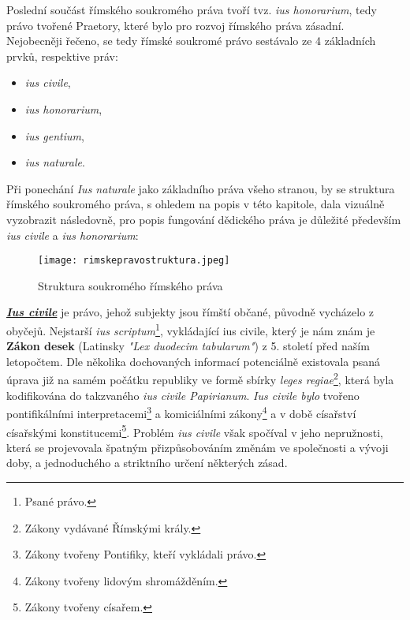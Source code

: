 \documentclass{article}
\begin{document}
Poslední součást římského soukromého práva tvoří tvz. \textit{ius honorarium}, tedy právo tvořené Praetory, které bylo pro rozvoj římského práva zásadní. \\


Nejobecněji řečeno, se tedy římské soukromé právo sestávalo ze 4 základních prvků, respektive práv:
\vspace{5 mm}

\begin{itemize}
\item \textit{ius civile},
\item \textit{ius honorarium},
\item \textit{ius gentium},
\item \textit{ius naturale}.
\end{itemize}

\vspace{5 mm}


Při ponechání \textit{Ius naturale} jako základního práva všeho stranou, by se struktura římského soukromého práva, s ohledem na popis v této kapitole, dala vizuálně vyzobrazit následovně, pro popis fungování dědického práva je důležité především \textit{ius civile} a \textit{ius honorarium}:

\begin{figure}[h]
\centering
\texttt{[image: rimskepravostruktura.jpeg]}
\caption{Struktura soukromého římského práva}
\label{fig:struktura}
\end{figure}

\underline{\textbf{\textit{Ius civile}}} je právo, jehož subjekty jsou římští občané, původně vycházelo z obyčejů. Nejstarší \textit{ius scriptum}\footnote{Psané právo.}, vykládající ius civile, který je nám znám je \textbf{Zákon \MakeUppercase{} desek} (Latinsky \textit{"Lex duodecim tabularum"}) z 5. století před naším letopočtem. Dle několika dochovaných informací potenciálně existovala psaná úprava již na samém počátku republiky ve formě sbírky \textit{leges regiae}\footnote{Zákony vydávané Římskými krály.}, která byla kodifikována do takzvaného \textit{ius civile Papirianum}. \textit{Ius civile bylo} tvořeno pontifikálními interpretacemi\footnote{Zákony tvořeny Pontifiky, kteří vykládali právo.} a komiciálními zákony\footnote{Zákony tvořeny lidovým shromážděním.} a v době císařství císařskými konstitucemi\footnote{Zákony tvořeny císařem.}. Problém \textit{ius civile} však spočíval v jeho nepružnosti, která se projevovala špatným přizpůsobováním změnám ve společnosti a vývoji doby, a jednoduchého a striktního určení některých zásad. \\
\end{document}
